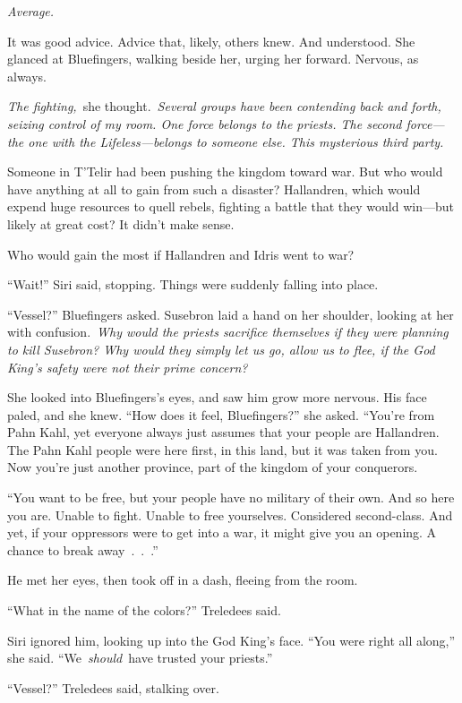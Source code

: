 \textit{Average.}

It was good advice. Advice that, likely, others knew. And understood. She glanced at Bluefingers, walking beside her, urging her forward. Nervous, as always.

\textit{The fighting,}~she thought.~\textit{Several groups have been contending back and forth, seizing control of my room. One force belongs to the priests. The second force—the one with the Lifeless—belongs to someone else. This mysterious third party.}

Someone in T’Telir had been pushing the kingdom toward war. But who would have anything at all to gain from such a disaster? Hallandren, which would expend huge resources to quell rebels, fighting a battle that they would win—but likely at great cost? It didn’t make sense.

Who would gain the most if Hallandren and Idris went to war?

“Wait!” Siri said, stopping. Things were suddenly falling into place.

“Vessel?” Bluefingers asked. Susebron laid a hand on her shoulder, looking at her with confusion.~\textit{Why would the priests sacrifice themselves if they were planning to kill Susebron? Why would they simply let us go, allow us to flee, if the God King’s safety were not their prime concern?}

She looked into Bluefingers’s eyes, and saw him grow more nervous. His face paled, and she knew. “How does it feel, Bluefingers?” she asked. “You’re from Pahn Kahl, yet everyone always just assumes that your people are Hallandren. The Pahn Kahl people were here first, in this land, but it was taken from you. Now you’re just another province, part of the kingdom of your conquerors.

“You want to be free, but your people have no military of their own. And so here you are. Unable to fight. Unable to free yourselves. Considered second-class. And yet, if your oppressors were to get into a war, it might give you an opening. A chance to break away~.~.~.”

He met her eyes, then took off in a dash, fleeing from the room.

“What in the name of the colors?” Treledees said.

Siri ignored him, looking up into the God King’s face. “You were right all along,” she said. “We~\textit{should}~have trusted your priests.”

“Vessel?” Treledees said, stalking over.

